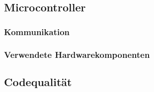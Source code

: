     \subsection{Microcontroller}

        \subsubsection{Kommunikation}
        \subsubsection{Verwendete Hardwarekomponenten}

    \subsection{Codequalität}